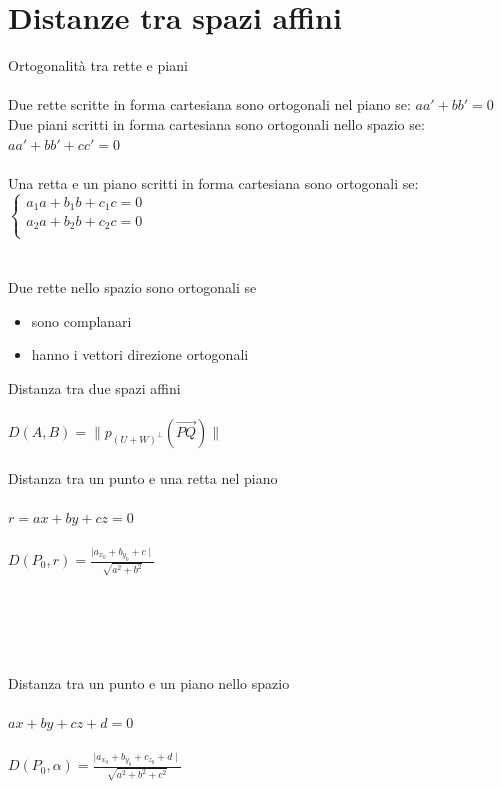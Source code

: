 \documentclass{article}
\begin{document}
\section{Distanze tra spazi affini}
{\large Ortogonalità tra rette e piani}\\\\
Due rette scritte in forma cartesiana sono ortogonali nel piano se: \(aa'+bb'=0\)\\
Due piani scritti in forma cartesiana sono ortogonali nello spazio se: \(aa'+bb'+cc'=0\)\\\\
Una retta e un piano scritti in forma cartesiana sono ortogonali se:\\
\(
\begin{cases}
    a_1a+b_1b+c_1c=0\\
    a_2a+b_2b+c_2c=0\\
\end{cases}
\)\\\\\\
Due rette nello spazio sono ortogonali se
\begin{itemize}
	\item sono complanari
	\item hanno i vettori direzione ortogonali 
\end{itemize}
{\large Distanza tra due spazi affini}\\\\
\(D(A,B)=\|p_{(U+W)^\perp}(\vec{PQ})\|\)\\\\
{\large Distanza tra un punto e una retta nel piano}\\\\
\(r=ax+by+cz=0\)\\\\
\(D(P_0,r)=\frac{\mid a_{x_0}+b_{y_0}+c\mid}{\sqrt{a^2+b^2}}\)\\\\\\\\\\\\
{\large Distanza tra un punto e un piano nello spazio}\\\\
\(ax+by+cz+d=0\)\\\\
\(D(P_0,\alpha)=\frac{\mid a_{x_0}+b_{y_0}+c_{z_0}+d\mid}{\sqrt{a^2+b^2+c^2}}\)\\\\\\
\end{document}
